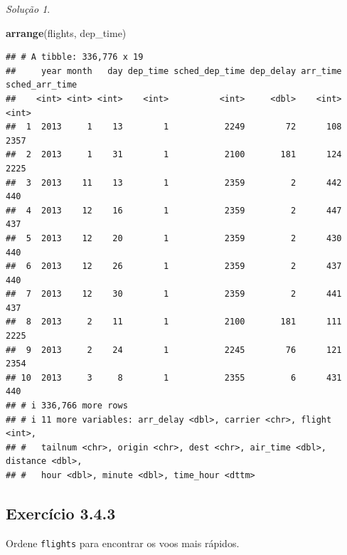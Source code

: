 \documentclass[
]{latex/krantz}
\newenvironment{Shaded}{\begin{snugshade}}{\end{snugshade}}
\newcommand{\FunctionTok}[1]{\textcolor[rgb]{0.13,0.29,0.53}{\textbf{#1}}}
\newcommand{\NormalTok}[1]{#1}
\theoremstyle{definition}
\theoremstyle{definition}
\theoremstyle{definition}
\theoremstyle{definition}
\theoremstyle{remark}
\newtheorem*{solution}{Solução}
\begin{document}
\begin{solution}
\begin{Shaded}
\begin{Highlighting}[]
\FunctionTok{arrange}\NormalTok{(flights, dep\_time)}
\end{Highlighting}
\end{Shaded}

\begin{verbatim}
## # A tibble: 336,776 x 19
##     year month   day dep_time sched_dep_time dep_delay arr_time sched_arr_time
##    <int> <int> <int>    <int>          <int>     <dbl>    <int>          <int>
##  1  2013     1    13        1           2249        72      108           2357
##  2  2013     1    31        1           2100       181      124           2225
##  3  2013    11    13        1           2359         2      442            440
##  4  2013    12    16        1           2359         2      447            437
##  5  2013    12    20        1           2359         2      430            440
##  6  2013    12    26        1           2359         2      437            440
##  7  2013    12    30        1           2359         2      441            437
##  8  2013     2    11        1           2100       181      111           2225
##  9  2013     2    24        1           2245        76      121           2354
## 10  2013     3     8        1           2355         6      431            440
## # i 336,766 more rows
## # i 11 more variables: arr_delay <dbl>, carrier <chr>, flight <int>,
## #   tailnum <chr>, origin <chr>, dest <chr>, air_time <dbl>, distance <dbl>,
## #   hour <dbl>, minute <dbl>, time_hour <dttm>
\end{verbatim}

\end{solution}

\hypertarget{exr3-4-3}{%
\subsection*{Exercício 3.4.3}\label{exr3-4-3}}

Ordene \texttt{flights} para encontrar os voos mais rápidos.
\end{document}
